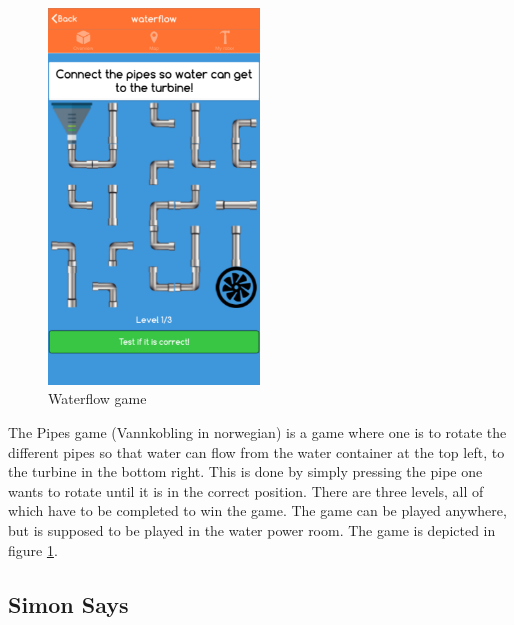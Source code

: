 \begin{figure}[H]
    \centering
    \includegraphics[width=0.5\textwidth]{images/app/waterflow.png}
    \caption{Waterflow game}
    \label{fig:waterflow}
\end{figure}

The Pipes game (Vannkobling in norwegian) is a game where one is to rotate the different pipes so that water can flow from the water container at the top left, to the turbine in the bottom right. This is done by simply pressing the pipe one wants to rotate until it is in the correct position. There are three levels, all of which have to be completed to win the game. The game can be played anywhere, but is supposed to be played in the water power room. The game is depicted in figure \ref{fig:waterflow}.


\subsection{Simon Says}

